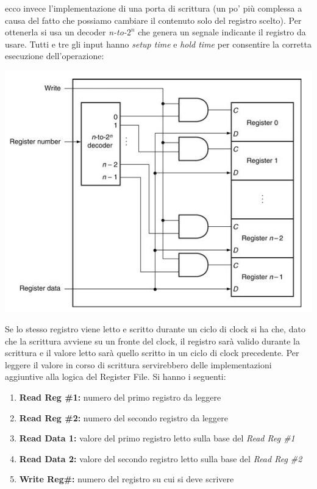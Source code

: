 \documentclass[a4paper,12pt, oneside]{book}
\begin{document}
\begin{itemize}
\begin{center}
  \end{center}
  ecco invece l'implementazione di una porta di scrittura (un po' più complessa a causa del fatto che possiamo cambiare il contenuto solo del registro scelto). Per ottenerla si usa un decoder \textit{n-to-}$2^n$ che genera un segnale indicante il registro da usare. Tutti e tre gli input hanno \textit{setup time} e \textit{hold time} per consentire la corretta esecuzione dell'operazione:
  \begin{center}
    \includegraphics[scale=0.6]{img/reg3.png}
  \end{center}
  \newpage
  Se lo stesso registro viene letto e scritto durante un ciclo di clock si ha che, dato che la scrittura avviene su un fronte del clock, il registro sarà valido durante la scrittura e il valore letto sarà quello scritto in un ciclo di clock precedente. Per leggere il valore in corso di scrittura servirebbero delle implementazioni aggiuntive alla logica del Register File. Si hanno i seguenti:
  \begin{enumerate}
    \item \textbf{Read Reg \#1:} numero del primo registro da leggere
    \item \textbf{Read Reg \#2:} numero del secondo registro da leggere
    \item \textbf{Read Data 1:} valore del primo registro letto sulla base del \textit{Read Reg \#1}
    \item \textbf{Read Data 2:} valore del secondo registro letto sulla base del \textit{Read Reg \#2}
    \item \textbf{Write Reg\#:} numero del registro su cui si deve scrivere

\end{enumerate}
\end{itemize}
\end{document}

